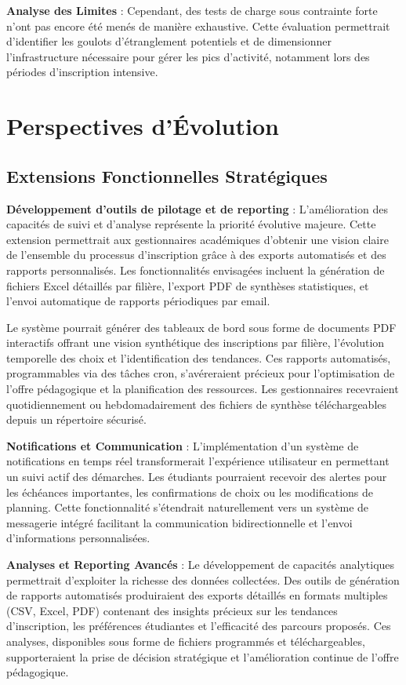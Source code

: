 \documentclass[12pt,a4paper]{report}
\begin{document}
\textbf{Analyse des Limites} : Cependant, des tests de charge sous contrainte forte n'ont pas encore été menés de manière exhaustive. Cette évaluation permettrait d'identifier les goulots d'étranglement potentiels et de dimensionner l'infrastructure nécessaire pour gérer les pics d'activité, notamment lors des périodes d'inscription intensive.

\section{Perspectives d'Évolution}

\subsection{Extensions Fonctionnelles Stratégiques}

\textbf{Développement d'outils de pilotage et de reporting} : L'amélioration des capacités de suivi et d'analyse représente la priorité évolutive majeure. Cette extension permettrait aux gestionnaires académiques d'obtenir une vision claire de l'ensemble du processus d'inscription grâce à des exports automatisés et des rapports personnalisés. Les fonctionnalités envisagées incluent la génération de fichiers Excel détaillés par filière, l'export PDF de synthèses statistiques, et l'envoi automatique de rapports périodiques par email.

Le système pourrait générer des tableaux de bord sous forme de documents PDF interactifs offrant une vision synthétique des inscriptions par filière, l'évolution temporelle des choix et l'identification des tendances. Ces rapports automatisés, programmables via des tâches cron, s'avéreraient précieux pour l'optimisation de l'offre pédagogique et la planification des ressources. Les gestionnaires recevraient quotidiennement ou hebdomadairement des fichiers de synthèse téléchargeables depuis un répertoire sécurisé.

\textbf{Notifications et Communication} : L'implémentation d'un système de notifications en temps réel transformerait l'expérience utilisateur en permettant un suivi actif des démarches. Les étudiants pourraient recevoir des alertes pour les échéances importantes, les confirmations de choix ou les modifications de planning. Cette fonctionnalité s'étendrait naturellement vers un système de messagerie intégré facilitant la communication bidirectionnelle et l'envoi d'informations personnalisées.

\textbf{Analyses et Reporting Avancés} : Le développement de capacités analytiques permettrait d'exploiter la richesse des données collectées. Des outils de génération de rapports automatisés produiraient des exports détaillés en formats multiples (CSV, Excel, PDF) contenant des insights précieux sur les tendances d'inscription, les préférences étudiantes et l'efficacité des parcours proposés. Ces analyses, disponibles sous forme de fichiers programmés et téléchargeables, supporteraient la prise de décision stratégique et l'amélioration continue de l'offre pédagogique.
\end{document}
